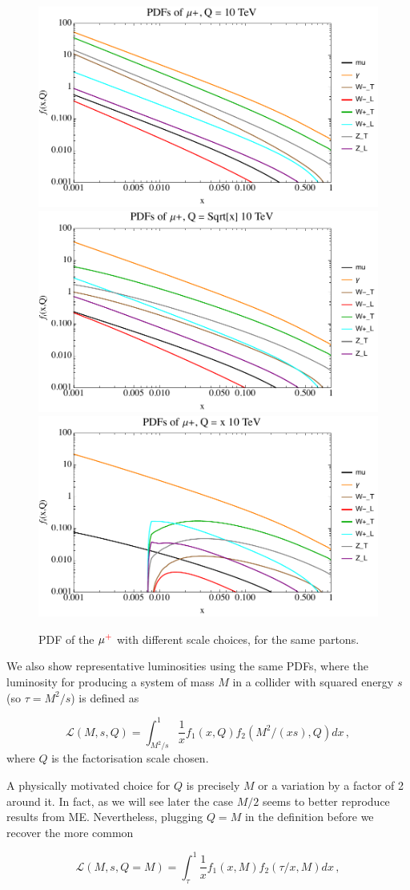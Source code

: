 \documentclass[a4paper,11pt]{article}
\begin{document}
\begin{figure}[!t]
\includegraphics[width=0.46\linewidth]{Notebooks/PlotPDFs/alltogether/10TeV_mu+scaleQ.pdf}
\includegraphics[width=0.46\linewidth]{Notebooks/PlotPDFs/alltogether/10TeV_mu+scaleQsqrtx.pdf}
\includegraphics[width=0.46\linewidth]{Notebooks/PlotPDFs/alltogether/10TeV_mu+scaleQx.pdf}
\caption{PDF of the $\mu^{\color{red} +}$ with different scale choices, for the same partons. \label{fig:allmup}}
\end{figure}


We also show representative luminosities using the same PDFs, where the luminosity for producing a system of mass $M$ in a collider with squared energy $s$ (so $\tau=M^2/s$) is defined as

\begin{equation}
\mathcal L(M,s,Q)=\int_{M^2/s}^1 \frac{1}{x} f_1(x,Q) f_2(M^2/(x s),Q) dx\, ,
\end{equation}
where $Q$ is the factorisation scale chosen.

A physically motivated choice for $Q$ is precisely $M$ or a variation by a factor of 2 around it. In fact, as we will see later the case $M/2$ seems to better reproduce results from ME. Nevertheless, plugging $Q=M$ in the definition before we recover the more common

\begin{equation}
\mathcal L(M,s,Q=M)=\int_{\tau}^1 \frac{1}{x} f_1(x,M) f_2(\tau/x,M) dx\, , \label{eq:lumicommon}
\end{equation}
\end{document}
